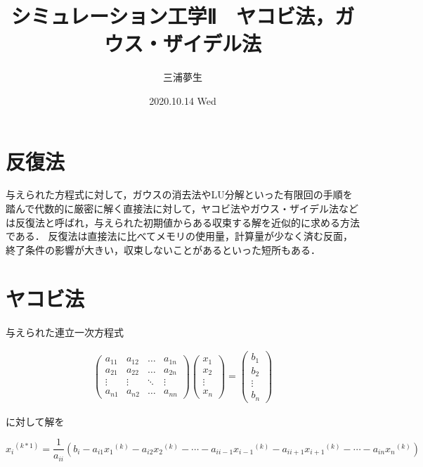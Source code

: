 \documentclass[a4paper, titlepage]{jsarticle}
\title{シミュレーション工学Ⅱ　ヤコビ法，ガウス・ザイデル法}
\author{三浦夢生}
\date{2020.10.14 Wed}
\begin{document}
	\maketitle

	\section{反復法}
	与えられた方程式に対して，ガウスの消去法やLU分解といった有限回の手順を踏んで代数的に厳密に解く直接法に対して，ヤコビ法やガウス・ザイデル法などは反復法と呼ばれ，与えられた初期値からある収束する解を近似的に求める方法である．
	反復法は直接法に比べてメモリの使用量，計算量が少なく済む反面，終了条件の影響が大きい，収束しないことがあるといった短所もある．

	\section{ヤコビ法}
	与えられた連立一次方程式
	
		\begin{align}
			\left(
				\begin{array}{cccc}
					{a_{11}} & {a_{12}} & {\ldots} & {a_{1n}} \\
					{a_{21}} & {a_{22}} & {\ldots} & {a_{2n}} \\
					{\vdots} & {\vdots} & {\ddots} & {\vdots} \\
					{a_{n1}} & {a_{n2}} & {\ldots} & {a_{nn}}
				\end{array}
			\right)
			\left(
				\begin{array}{cccc}
					{x_{1}} \\
					{x_{2}} \\
					{\vdots} \\
					{x_{n}}
				\end{array}
			\right)
			=
			\left(
				\begin{array}{cccc}
					{b_{1}} \\
					{b_{2}} \\
					{\vdots} \\
					{b_{n}}
				\end{array}
			\right)
		\end{align}

	に対して解を

		\begin{equation}
			{{x_{i}}^{(k*1)}} = {\frac{1}{a_{ii}}}({b_{i}} - {a_{i1}}{{x_{1}}^{(k)}} - {a_{i2}}{{x_{2}}^{(k)}} - {\cdots} - {a_{ii-1}}{{x_{i-1}}^{(k)}} - {a_{ii+1}}{{x_{i+1}}^{(k)}} - {\cdots} - {a_{in}}{{x_{n}}^{(k)}})
		\end{equation}
\end{document}
